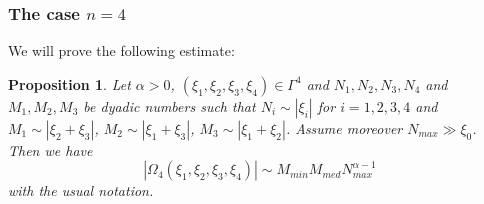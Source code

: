 \documentclass{amsart}
\newtheorem{proposition}[theorem]{Proposition}
\theoremstyle{definition}
\theoremstyle{remark}
\numberwithin{equation}{section}
\begin{document}
\subsubsection{The case $n=4$}
We will prove the following estimate:
\begin{proposition}\label{est-Omega4}
  Let  $\alpha>0$,  $(\xi_1,\xi_2,\xi_3,\xi_4)\in \Gamma^4$ and $N_1,N_2,N_3,N_4$ and $M_1,M_2,M_3$ be dyadic numbers such that $N_i\sim |\xi_i|$ for $i=1,2,3,4$ and $M_1\sim|\xi_2+\xi_3|$, $M_2\sim |\xi_1+\xi_3|$, $M_3\sim |\xi_1+\xi_2|$. Assume moreover $N_{max}  \gg \xi_0$. Then we have
  \begin{equation}\label{est-Omega4.0}
    |\Omega_4(\xi_1,\xi_2,\xi_3,\xi_4)| \sim M_{min}M_{med}N_{max}^{\alpha-1}
  \end{equation}
  with the usual notation.
\end{proposition}
\end{document}
